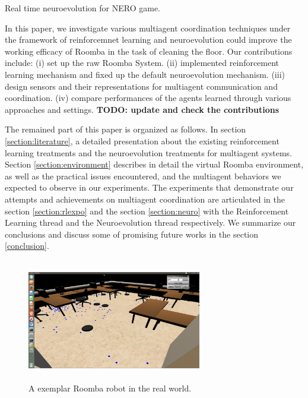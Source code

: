 \documentclass[conference]{IEEEtran}
\begin{document}
\cite{stanley2005real} Real time neuroevolution for NERO game. 

In this paper, we
investigate various multiagent coordination techniques under the framework of
reinforcemnet learning and neuroevolution could improve the working efficacy
of Roomba in the task of cleaning the floor. 
Our contributions include: 
(i) set up the raw Roomba System. 
(ii) implemented reinforcement learning mechanism and fixed up the default
neuroevolution mechanism. 
(iii) design sensors and their representations for multiagent
communication and coordination. 
(iv) compare performances of the agents learned through various approaches and
settings.
\textbf{TODO: update and check the contributions}

The remained part of this paper is organized as follows. 
In section \ref{section:literature}, a detailed presentation about the
existing  reinforcement learning treatments and the neuroevolution treatments
for multiagent systems.  
Section \ref{section:environment} describes in detail the virtual Roomba
environment, as well as the practical issues encountered, and the multiagent
behaviors we expected to observe in our experiments.  
The experiments that demonstrate our attempts and achievements on multiagent
coordination are articulated in the section \ref{section:rlexpo}  and the
section \ref{section:neuro} with the Reinforcement Learning thread and the
Neuroevolution thread respectively.  
We summarize our conclusions and discuss some of promising future works in the
section \ref{conclusion}. 


\begin{figure}[!t]
\centering
\includegraphics[width=3in,height=2.1in]{./figures/roombas/roomba3.png}
\caption{A exemplar Roomba robot in the real world.}
\label{roomba:world}
\end{figure}
\end{document}
